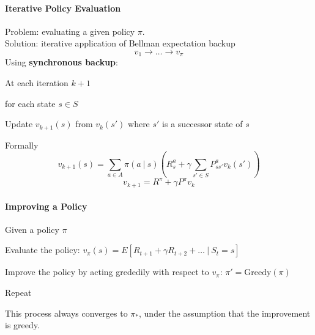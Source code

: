 \documentclass[10pt]{report}
\begin{document}
\paragraph{Iterative Policy Evaluation} Problem: evaluating a given policy $\pi$.\\
Solution: iterative application of Bellman expectation backup
$$v_1\rightarrow \ldots \rightarrow v_\pi$$
Using \textbf{synchronous backup}:
\begin{list}{}{}
	\item At each iteration $k+1$
	\item for each state $s\in S$
	\item Update $v_{k+1}(s)$ from $v_k(s')$ where $s'$ is a successor state of $s$
\end{list}
Formally
$$v_{k+1}(s) = \sum_{a\in A} \pi(a\:|\:s)\left(R_s^a+\gamma\sum_{s'\in S}P_{ss'}^av_k(s')\right)$$
$$v_{k+1} = R^\pi +\gamma P^\pi v_k$$
\paragraph{Improving a Policy} Given a policy $\pi$\begin{list}{}{}
	\item Evaluate the policy: $v_\pi(s) = E[R_{t+1} + \gamma R_{t+2} + \ldots\:|\:S_t =s]$
	\item Improve the policy by acting grededily with respect to $v_\pi$:
	$\pi' = \text{Greedy}(\pi)$
	\item Repeat
\end{list}
This process always converges to $\pi_*$, under the assumption that the improvement is greedy.
\end{document}
